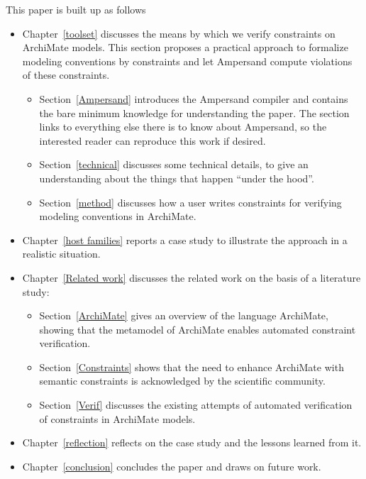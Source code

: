 \documentclass[sn-vancouver]{sn-jnl}%
\begin{document}
This paper is built up as follows
\begin{itemize}
\item Chapter~\ref{toolset} discusses the means by which we verify constraints on ArchiMate models.
This section proposes a practical approach to formalize modeling conventions by constraints and let Ampersand compute violations of these constraints.
\begin{itemize}
   \item Section~\ref{Ampersand} introduces the Ampersand compiler and contains the bare minimum knowledge for understanding the paper.
The section links to everything else there is to know about Ampersand, so the interested reader can reproduce this work if desired.
   \item Section~\ref{technical} discusses some technical details, to give an understanding about the things that happen ``under the hood''.
   \item Section~\ref{method} discusses how a user writes constraints for verifying modeling conventions in ArchiMate.
\end{itemize}
\item Chapter~\ref{host families} reports a case study to illustrate the approach in a realistic situation.
\item Chapter~\ref{Related work} discusses the related work on the basis of a literature study:
\begin{itemize}
   \item Section~\ref{ArchiMate} gives an overview of the language ArchiMate, showing that the metamodel of ArchiMate enables automated constraint verification.
   \item Section~\ref{Constraints} shows that the need to enhance ArchiMate with semantic constraints is acknowledged by the scientific community.
   \item Section~\ref{Verif} discusses the existing attempts of automated verification of constraints in ArchiMate models.
\end{itemize}
\item Chapter~\ref{reflection} reflects on the case study and the lessons learned from it.
\item Chapter~\ref{conclusion} concludes the paper and draws on future work.
\end{itemize}
\end{document}

